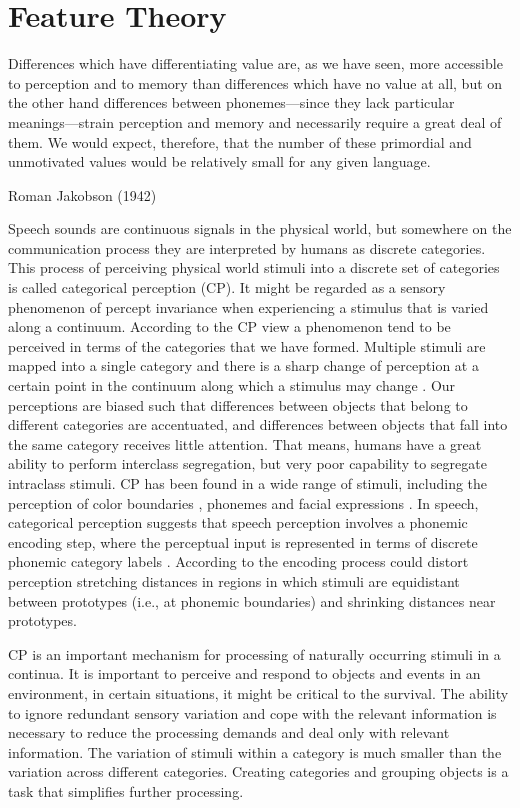 \chapter{Feature Theory}
\label{cp:featuretheory}
\epigraph{Differences which have differentiating value are, as we have seen, more
accessible to perception and to memory than differences which have no value at
all, but on the other hand differences between phonemes—since they lack
particular meanings—strain perception and memory and necessarily require a
great deal of them. We would expect, therefore, that the number of these
primordial and unmotivated values would be relatively small for any given
language.}{Roman Jakobson (1942)}

Speech sounds are continuous signals in the physical world, but somewhere on the communication process they are interpreted by humans as discrete categories. This process of perceiving physical world stimuli into a discrete set of categories is called categorical perception (CP). It might be regarded as a sensory phenomenon of percept invariance when experiencing a stimulus that is varied along a continuum.  According to the CP view a phenomenon tend to be perceived in terms of the categories that we have formed. Multiple stimuli are mapped into a single category and there is a sharp change of perception at a certain point in the continuum along which a stimulus may change \citep{liberman1957}. Our perceptions are biased such that differences between objects that belong to different categories are accentuated, and differences between objects that fall into the same category receives little attention. That means, humans have a great ability to perform interclass segregation, but very poor capability to segregate intraclass stimuli. CP has been found in a wide range of stimuli, including the perception of color boundaries \citep{korda1984}, phonemes \citep{liberman1957} and facial expressions \citep{etcoff1992}. In speech, categorical perception suggests that speech perception involves a phonemic encoding step, where the perceptual input is represented in terms of discrete phonemic category labels \cite{liberman1957}. According to \cite{kuhl2000} the encoding process could distort perception stretching distances in regions in which stimuli are equidistant between prototypes (i.e., at phonemic boundaries) and shrinking distances near prototypes.

CP is an important mechanism for processing of naturally occurring stimuli in a continua. It is important to
perceive and respond to objects and events in an environment, in certain situations, it might be critical to the
survival. The ability to ignore redundant sensory variation and cope with the relevant information is necessary
to reduce the processing demands and deal only with relevant information. The variation of stimuli within a category
is much smaller than the variation across different categories. Creating categories and grouping objects is
a task that simplifies further processing.

